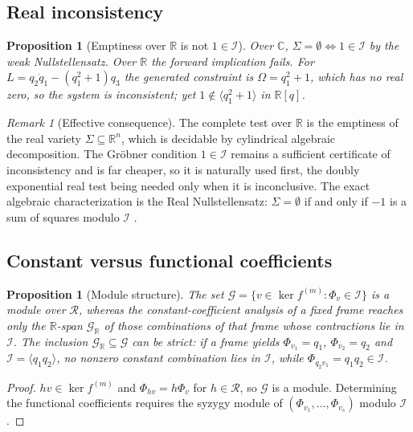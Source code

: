 \documentclass[12pt]{article}
\theoremstyle{plain}
\newtheorem{proposition}[theorem]{Proposition}
\theoremstyle{definition}
\theoremstyle{remark}
\newtheorem{remark}[theorem]{Remark}
\newcommand{\R}{\mathbb{R}}
\newcommand{\C}{\mathbb{C}}
\newcommand{\Om}{\Omega}
\newcommand{\Ical}{\mathcal{I}}
\newcommand{\Rring}{\mathcal{R}}
\newcommand{\gen}[1]{\langle #1\rangle}
\begin{document}
	\subsection{Real inconsistency}
	
	\begin{proposition}[Emptiness over $\R$ is not $1\in\Ical$]
		\label{prop:real}
		Over $\C$, $\Sigma=\emptyset\iff1\in\Ical$ by the weak Nullstellensatz. Over
		$\R$ the forward implication fails. For $L=q_{2}\dot q_{1}-(q_{1}^{2}+1)q_{3}$
		the generated constraint is $\Om=q_{1}^{2}+1$, which has no real zero, so the
		system is inconsistent; yet $1\notin\gen{q_{1}^{2}+1}$ in $\R[q]$.
	\end{proposition}
	
	\begin{remark}[Effective consequence]
		\label{rem:cad}
		The complete test over $\R$ is the emptiness of the real variety
		$\Sigma\subseteq\R^{n}$, which is decidable by cylindrical algebraic
		decomposition. The Gr\"obner condition $1\in\Ical$ remains a sufficient
		certificate of inconsistency and is far cheaper, so it is naturally used first,
		the doubly exponential real test being needed only when it is inconclusive. The exact algebraic characterization is the Real
		Nullstellensatz: $\Sigma=\emptyset$ if and only if $-1$ is a sum of squares
		modulo $\Ical$ \cite{BCR1998}.
	\end{remark}
	
	\subsection{Constant versus functional coefficients}
	
	\begin{proposition}[Module structure]
		\label{prop:syzygy}
		The set $\mathcal{G}=\{v\in\ker f^{(m)}:\Phi_{v}\in\Ical\}$ is a module over
		$\Rring$, whereas the constant-coefficient analysis of a fixed frame reaches
		only the $\R$-span $\mathcal{G}_{\R}$ of those combinations of that frame whose
		contractions lie in $\Ical$. The inclusion
		$\mathcal{G}_{\R}\subseteq\mathcal{G}$ can be strict: if a frame yields
		$\Phi_{v_{1}}=q_{1}$, $\Phi_{v_{2}}=q_{2}$ and $\Ical=\gen{q_{1}q_{2}}$, no
		nonzero constant combination lies in $\Ical$, while
		$\Phi_{q_{2}v_{1}}=q_{1}q_{2}\in\Ical$.
	\end{proposition}
	
	\begin{proof}
		$hv\in\ker f^{(m)}$ and $\Phi_{hv}=h\Phi_{v}$ for $h\in\Rring$, so
		$\mathcal{G}$ is a module. Determining the functional coefficients requires the
		syzygy module of $(\Phi_{v_{1}},\dots,\Phi_{v_{s}})$ modulo $\Ical$.
	\end{proof}
	
\end{document}
